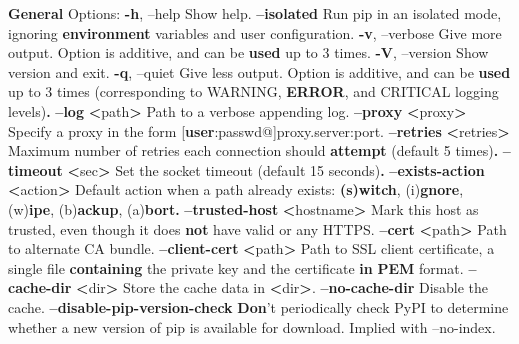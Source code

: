 \documentclass[11pt]{article}
\newenvironment{Shaded}{}{}
\newcommand{\KeywordTok}[1]{\textcolor[rgb]{0.00,0.44,0.13}{\textbf{{#1}}}}
\newcommand{\StringTok}[1]{\textcolor[rgb]{0.25,0.44,0.63}{{#1}}}
\newcommand{\NormalTok}[1]{{#1}}
\begin{document}
\begin{Shaded}
\begin{Highlighting}[]
\KeywordTok{General} \NormalTok{Options:}
  \KeywordTok{-h}\NormalTok{, --help                  Show help.}
  \KeywordTok{--isolated}                  \NormalTok{Run pip in an isolated mode, ignoring}
                              \KeywordTok{environment} \NormalTok{variables and user configuration.}
  \KeywordTok{-v}\NormalTok{, --verbose               Give more output. Option is additive, and can be}
                              \KeywordTok{used} \NormalTok{up to 3 times.}
  \KeywordTok{-V}\NormalTok{, --version               Show version and exit.}
  \KeywordTok{-q}\NormalTok{, --quiet                 Give less output. Option is additive, and can be}
                              \KeywordTok{used} \NormalTok{up to 3 times (corresponding to WARNING,}
                              \KeywordTok{ERROR}\NormalTok{, and CRITICAL logging levels)}\KeywordTok{.}
  \KeywordTok{--log} \KeywordTok{<}\NormalTok{path}\KeywordTok{>}                \NormalTok{Path to a verbose appending log.}
  \KeywordTok{--proxy} \KeywordTok{<}\NormalTok{proxy}\KeywordTok{>}             \NormalTok{Specify a proxy in the form}
                              \NormalTok{[}\KeywordTok{user}\NormalTok{:passwd@]proxy.server:port.}
  \KeywordTok{--retries} \KeywordTok{<}\NormalTok{retries}\KeywordTok{>}         \NormalTok{Maximum number of retries each connection should}
                              \KeywordTok{attempt} \NormalTok{(default 5 times)}\KeywordTok{.}
  \KeywordTok{--timeout} \KeywordTok{<}\NormalTok{sec}\KeywordTok{>}             \NormalTok{Set the socket timeout (default 15 seconds)}\KeywordTok{.}
  \KeywordTok{--exists-action} \KeywordTok{<}\NormalTok{action}\KeywordTok{>}    \NormalTok{Default action when a path already exists:}
                              \KeywordTok{(s)witch}\NormalTok{, (i)}\KeywordTok{gnore}\NormalTok{, (w)}\KeywordTok{ipe}\NormalTok{, (b)}\KeywordTok{ackup}\NormalTok{, (a)}\KeywordTok{bort.}
  \KeywordTok{--trusted-host} \KeywordTok{<}\NormalTok{hostname}\KeywordTok{>}   \NormalTok{Mark this host as trusted, even though it does}
                              \KeywordTok{not} \NormalTok{have valid or any HTTPS.}
  \KeywordTok{--cert} \KeywordTok{<}\NormalTok{path}\KeywordTok{>}               \NormalTok{Path to alternate CA bundle.}
  \KeywordTok{--client-cert} \KeywordTok{<}\NormalTok{path}\KeywordTok{>}        \NormalTok{Path to SSL client certificate, a single file}
                              \KeywordTok{containing} \NormalTok{the private key and the certificate}
                              \KeywordTok{in} \KeywordTok{PEM} \NormalTok{format.}
  \KeywordTok{--cache-dir} \KeywordTok{<}\NormalTok{dir}\KeywordTok{>}           \NormalTok{Store the cache data in }\KeywordTok{<}\NormalTok{dir}\KeywordTok{>}\NormalTok{.}
  \KeywordTok{--no-cache-dir}              \NormalTok{Disable the cache.}
  \KeywordTok{--disable-pip-version-check}
                              \KeywordTok{Don}\StringTok{'t periodically check PyPI to determine}
\StringTok{                              whether a new version of pip is available for}
\StringTok{                              download. Implied with --no-index.}
\end{Highlighting}
\end{Shaded}
\end{document}
